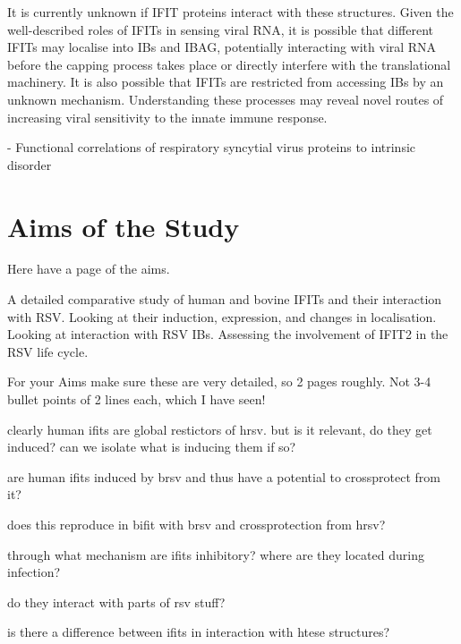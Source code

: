 It is currently unknown if IFIT proteins interact with these structures. Given the well-described roles of IFITs in sensing viral RNA, it is possible that different IFITs may localise into IBs and IBAG, potentially interacting with viral RNA before the capping process takes place or directly interfere with the translational machinery. It is also possible that IFITs are restricted from accessing IBs by an unknown mechanism. Understanding these processes may reveal novel routes of increasing viral sensitivity to the innate immune response.



\cite{Whelan2016FunctionalDisorder} - Functional correlations of respiratory syncytial virus proteins to intrinsic disorder





\section{Aims of the Study} \label{sec:Aims}
Here have a page of the aims.

A detailed comparative study of human and bovine IFITs and their interaction with RSV. Looking at their induction, expression, and changes in localisation. Looking at interaction with RSV IBs. Assessing the involvement of IFIT2 in the RSV life cycle.

For your Aims make sure these are very detailed, so 2 pages roughly. Not 3-4 bullet points of 2 lines each, which I have seen!

clearly human ifits are global restictors of hrsv. but is it relevant, do they get induced? can we isolate what is inducing them if so? 

are human ifits induced by brsv and thus have a potential to crossprotect from it?

does this reproduce in bifit with brsv and crossprotection from hrsv?

through what mechanism are ifits inhibitory? where are they located during infection?

do they interact with parts of rsv stuff?

is there a difference between ifits in interaction with htese structures?



